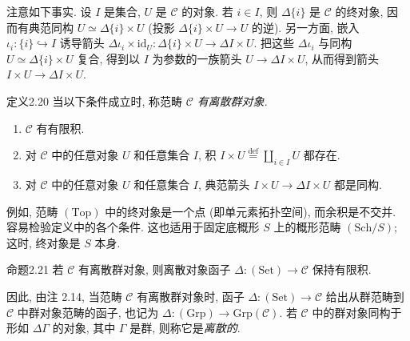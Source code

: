注意如下事实. 设 $I$ 是集合, $U$ 是 $\mathcal C$ 的对象. 若 $i\in I$, 则 $\Delta\{i\}$ 是 $\mathcal C$ 的终对象, 因而有典范同构 $U\simeq\Delta\{i\}\times U$ (投影 $\Delta\{i\}\times U\to U$ 的逆). 另一方面, 嵌入 $\iota_i:\{i\}\hookrightarrow I$ 诱导箭头 $\Delta\iota_i\times\mathrm{id}_U:\Delta\{i\}\times U\to\Delta I\times U$. 把这些 $\Delta\iota_i$ 与同构 $U\simeq\Delta\{i\}\times U$ 复合, 得到以 $I$ 为参数的一族箭头 $U\to\Delta I\times U$, 从而得到箭头 $I\times U\to\Delta I\times U$.

\begin{origstatement}{定义}{2.20}\label{ch02:def220}
当以下条件成立时, 称范畴 $\mathcal C$ \emph{有离散群对象}.
\begin{enumerate}
\item[(i)] $\mathcal C$ 有有限积.
\item[(ii)] 对 $\mathcal C$ 中的任意对象 $U$ 和任意集合 $I$, 积 $I\times U\overset{\mathrm{def}}=\coprod_{i\in I}U$ 都存在.
\item[(iii)] 对 $\mathcal C$ 中的任意对象 $U$ 和任意集合 $I$, 典范箭头 $I\times U\to\Delta I\times U$ 都是同构.
\end{enumerate}
\end{origstatement}

例如, 范畴 $(\mathrm{Top})$ 中的终对象是一个点 (即单元素拓扑空间), 而余积是不交并. 容易检验定义中的各个条件. 这也适用于固定底概形 $S$ 上的概形范畴 $(\mathrm{Sch}/S)$; 这时, 终对象是 $S$ 本身.

\begin{origstatement}{命题}{2.21}\label{ch02:prop221}
若 $\mathcal C$ 有离散群对象, 则离散对象函子 $\Delta:(\mathrm{Set})\to\mathcal C$ 保持有限积.
\end{origstatement}

因此, 由注 2.14, 当范畴 $\mathcal C$ 有离散群对象时, 函子 $\Delta:(\mathrm{Set})\to\mathcal C$ 给出从群范畴到 $\mathcal C$ 中群对象范畴的函子, 也记为 $\Delta:(\mathrm{Grp})\to\mathrm{Grp}(\mathcal C)$. 若 $\mathcal C$ 中的群对象同构于形如 $\Delta\Gamma$ 的对象, 其中 $\Gamma$ 是群, 则称它是\emph{离散的}.

